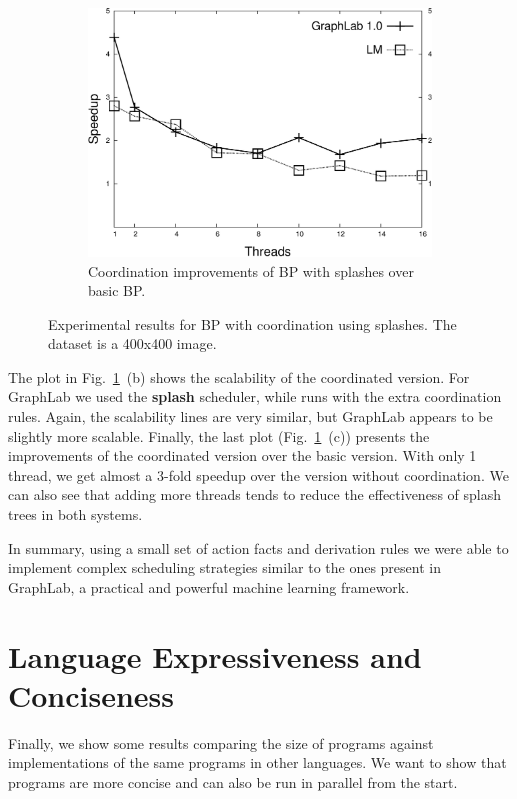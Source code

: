 \begin{figure}[ht]
\begin{subfigure}[b]{0.3\textwidth}
      \includegraphics[width=\textwidth]{new-benchmarks/improv_bp-graphlab-400.pdf}
      \caption{Coordination improvements of BP with splashes over basic BP.}
   \end{subfigure}
   \caption{Experimental results for BP with coordination using splashes. The dataset is a 400x400 image.}
   \label{exp:splashbp}
\end{figure}

The plot in Fig.~\ref{exp:splashbp}~(b) shows the scalability of the coordinated version. For GraphLab we used the \textbf{splash} scheduler, while \lang
runs with the extra coordination rules. Again, the scalability lines are very similar, but GraphLab appears to be slightly more scalable.
Finally, the last plot (Fig.~\ref{exp:splashbp}~(c)) presents the improvements of the coordinated version over the basic version.
With only 1 thread, we get almost a 3-fold speedup over the version without coordination. We can also see that adding more threads tends to reduce the effectiveness of splash trees in both systems.

In summary, using a small set of action facts and derivation rules we were able to implement complex
scheduling strategies similar to the ones present in GraphLab, a practical and powerful machine learning
framework.

\section{Language Expressiveness and Conciseness}

Finally, we show some results comparing the size of \lang programs against implementations of the same
programs in other languages. We want to show that \lang programs are more concise and can also be run in parallel from the start.

